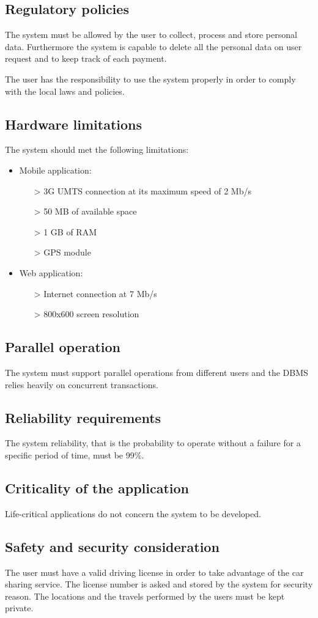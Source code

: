 \subsection{Regulatory policies}
The system must be allowed by the user to collect, process and store personal data. Furthermore the system is capable to delete all the personal data on user request and to keep track of each payment.

The user has the responsibility to use the system properly in order to comply with the local laws and policies.

\subsection{Hardware limitations} \label{ssec:hlimit}
The system should met the following limitations:
\begin{itemize}
\item Mobile application:
	\begin{itemize}
	\item[>] 3G UMTS connection at its maximum speed of 2 Mb/s
	\item[>] 50 MB of available space
	\item[>] 1 GB of RAM
	\item[>] GPS module
	\end{itemize}
\item Web application:
	\begin{itemize}
	\item[>] Internet connection at 7 Mb/s
	\item[>] 800x600 screen resolution
	\end{itemize}
\end{itemize}

\subsection{Parallel operation}
The system must support parallel operations from different users and the DBMS relies heavily on concurrent transactions.

\subsection{Reliability requirements}
The system reliability, that is the probability to operate without a failure for a specific period of time, must be 99\%.

\subsection{Criticality of the application}
Life-critical applications do not concern the system to be developed.

\subsection{Safety and security consideration}
The user must have a valid driving license in order to take advantage of the car sharing service. The license number is asked and stored by the system for security reason. The locations and the travels performed by the users must be kept private.